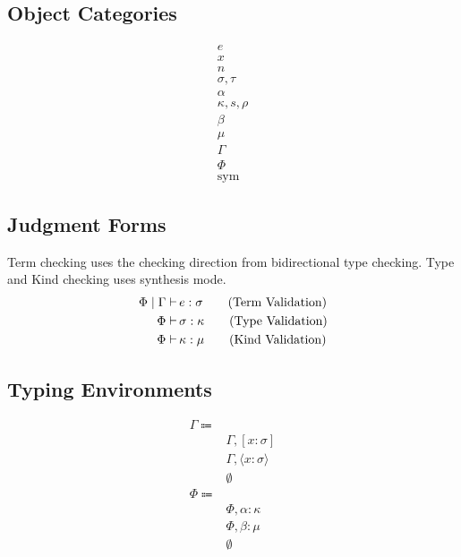 \documentclass {article}
\begin{document}
\subsection{Object Categories}

\begin{align*}
e \tag{Terms} \\
x \tag{Variables} \\
n \tag{Numbers} \\
\sigma, \tau \tag{Types} \\
\alpha \tag{Type Variables} \\
\kappa, s, \rho \tag{Kinds} \\
\beta \tag{Kind Variables} \\
\mu \tag{Sorts} \\
\Gamma \tag{Type Environment} \\
\Phi \tag{Misc Environment} \\
\text{sym} \tag{Symbol}
\end{align*}


\subsection{Judgment Forms}
Term checking uses the checking direction from bidirectional type checking.
Type and Kind checking uses synthesis mode.
\begin{align*}
\Phi \mid \Gamma \vdash \, & e : \sigma \tag{\text{Term Validation}} \\
\Phi \vdash \, & \sigma : \kappa \tag{\text{Type Validation}} \\
\Phi \vdash \, & \kappa : \mu \tag{Kind Validation} \\
\end{align*}

\subsection{Typing Environments}
\begin{align*}
\Gamma \Coloneqq & \\
& \Gamma, [x : \sigma] \\
& \Gamma, \langle x : \sigma \rangle \\
& \emptyset \\
\Phi \Coloneqq & \\
& \Phi, \alpha : \kappa \\
& \Phi, \beta : \mu \\
& \emptyset \\
\end{align*}
\end{document}
